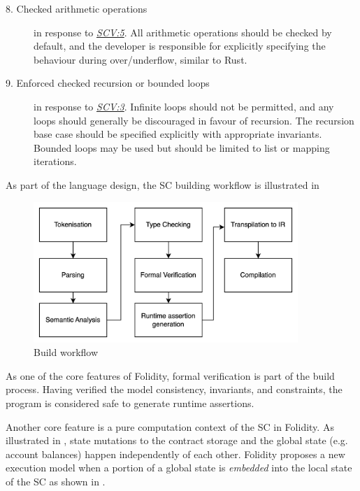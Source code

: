 \documentclass[oneside]{ecsproject}     %
\newcommand{\vref}[1]{\textit{\hyperref[#1]{#1}}}
\begin{document}
\begin{description}
  \item[8. Checked arithmetic operations]\label{Requirements:8} in response to \vref{SCV:5}. 
All arithmetic operations should be checked by default, and the developer is responsible for explicitly specifying the behaviour during over/underflow, similar to Rust.
  \item[9. Enforced checked recursion or bounded loops]\label{Requirements:9} in response to \vref{SCV:3}.
Infinite loops should not be permitted, and any loops should generally be discouraged in favour of recursion. The recursion base case should be specified explicitly with appropriate invariants.
Bounded loops may be used but should be limited to list or mapping iterations.
\end{description}

As part of the language design, the SC building workflow is illustrated in 

\begin{figure}[!htb]
  \centering
  \includegraphics[width=10cm]{compilation.png}
  \caption{Build workflow}
  \label{Figure:compilation}
\end{figure}

As one of the core features of Folidity, formal verification is part of the build process.
Having verified the model consistency, invariants, and constraints, the program is considered safe to generate runtime assertions.

Another core feature is a pure computation context of the SC in Folidity. As illustrated in ,
state mutations to the contract storage and the global state (e.g. account balances) happen independently of each other. 
Folidity proposes a new execution model when a portion of a global state is \textit{embedded} into the local state of the SC 
as shown in . 
\end{document}
